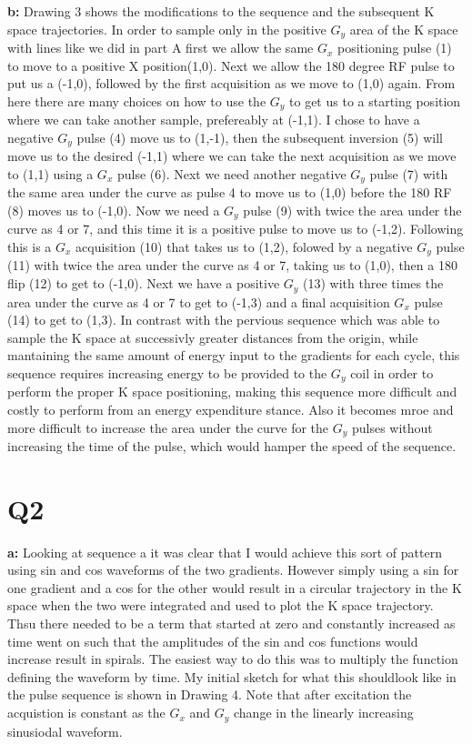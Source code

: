 \documentclass[12pt]{article}
\begin{document}
\noindent\textbf{b: } Drawing 3 shows the modifications to the sequence and the subsequent K space trajectories. In order to sample only in the positive $G_y$ area of the K space with lines like we did in part A first we allow the same $G_x$ positioning pulse (1) to move to a positive X position(1,0). Next we allow the 180 degree RF pulse to put us a (-1,0), followed by the first acquisition as we move to (1,0) again. From here there are many choices on how to use the $G_y$ to get us to a starting position where we can take another sample, prefereably at (-1,1). I chose to have a negative $G_y$ pulse (4) move us to (1,-1), then the subsequent inversion (5) will move us to the desired (-1,1) where we can take the next acquisition as we move to (1,1) using a $G_x$ pulse (6). Next we need another negative $G_y$ pulse (7) with the same area under the curve as pulse 4 to move us to (1,0) before the 180 RF (8) moves us to (-1,0). Now we need a $G_y$ pulse (9) with twice the area under the curve as 4 or 7, and this time it is a positive pulse to move us to (-1,2). Following this is a $G_x$ acquisition (10) that takes us to (1,2), folowed by a negative $G_y$ pulse (11) with twice the area under the curve as 4 or 7, taking us to (1,0), then a 180 flip (12) to get to (-1,0). Next we have a positive $G_y$ (13) with three times the area under the curve as 4 or 7 to get to (-1,3) and a final acquisition $G_x$ pulse (14) to get to (1,3). In contrast with the pervious sequence which was able to sample the K space at successivly greater distances from the origin, while mantaining the same amount of energy input to the gradients for each cycle, this sequence requires increasing energy to be provided to the $G_y$ coil in order to perform the proper K space positioning, making this sequence more difficult and costly to perform from an energy expenditure stance. Also it becomes mroe and more difficult to increase the area under the curve for the $G_y$ pulses without increasing the time of the pulse, which would hamper the speed of the sequence.

\section{Q2}
\noindent\textbf{a: }
Looking at sequence a it was clear that I would achieve this sort of pattern using sin and cos waveforms of the two gradients.  However simply using a sin for one gradient and a cos for the other would result in a circular trajectory in the K space when the two were integrated and used to plot the K space trajectory. Thsu there needed to be a term that started at zero and constantly increased as time went on such that the amplitudes of the sin and cos functions would increase result in spirals. The easiest way to do this was to multiply the function defining the waveform by time. My initial sketch for what this shouldlook like in the pulse sequence is shown in Drawing  4. Note that after excitation the acquistion is constant as the $G_x$ and $G_y$ change in the linearly increasing sinusiodal waveform.
\end{document}
